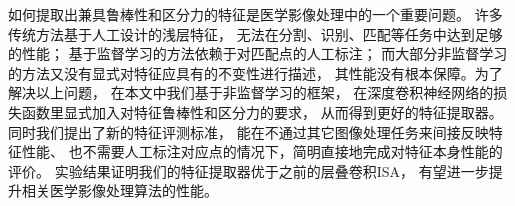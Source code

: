 如何提取出兼具鲁棒性和区分力的特征是医学影像处理中的一个重要问题。
许多传统方法基于人工设计的浅层特征，
无法在分割、识别、匹配等任务中达到足够的性能；
基于监督学习的方法依赖于对匹配点的人工标注；
而大部分非监督学习的方法又没有显式对特征应具有的不变性进行描述，
其性能没有根本保障。为了解决以上问题，
在本文中我们基于非监督学习的框架，
在深度卷积神经网络的损失函数里显式加入对特征鲁棒性和区分力的要求，
从而得到更好的特征提取器。同时我们提出了新的特征评测标准，
能在不通过其它图像处理任务来间接反映特征性能、
也不需要人工标注对应点的情况下，简明直接地完成对特征本身性能的评价。
实验结果证明我们的特征提取器优于之前的层叠卷积ISA，
有望进一步提升相关医学影像处理算法的性能。
